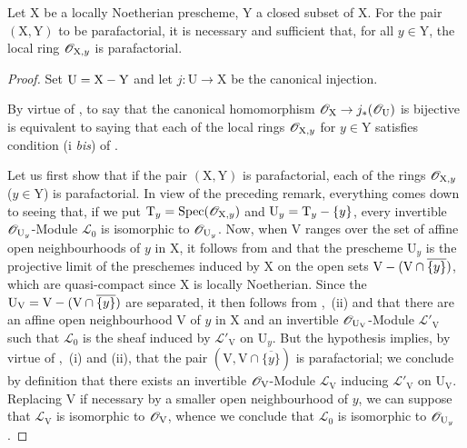 \begin{proposition}[21.13.10]
\label{IV.21.13.10}
Let $\mathrm{X}$ be a locally Noetherian prescheme, $\mathrm{Y}$ a closed subset of $\mathrm{X}$.
For the pair $(\mathrm{X},\mathrm{Y})$ to be parafactorial, it is necessary and sufficient that, for all $y\in\mathrm{Y}$, the local ring $\mathscr{O}_{\mathrm{X},y}$ is parafactorial.
\end{proposition}

\begin{proof}
Set $\mathrm{U}=\mathrm{X}-\mathrm{Y}$ and let $j:\mathrm{U}\to\mathrm{X}$ be the canonical injection.

By virtue of , to say that the canonical homomorphism $\mathscr{O}_{\mathrm{X}}\to j_*(\mathscr{O}_{\mathrm{U}})$ is bijective is equivalent to saying that each of the local rings $\mathscr{O}_{\mathrm{X},y}$ for $y\in\mathrm{Y}$ satisfies condition (i \emph{bis}) of .

Let us first show that if the pair $(\mathrm{X},\mathrm{Y})$ is parafactorial, each of the rings $\mathscr{O}_{\mathrm{X},y}$ ($y\in\mathrm{Y}$) is parafactorial.
In view of the preceding remark, everything comes down to seeing that, if we put $\mathrm{T}_y=\operatorname{Spec}(\mathscr{O}_{\mathrm{X},y})$ and $\mathrm{U}_y=\mathrm{T}_y-\{y\}$, every invertible $\mathscr{O}_{\mathrm{U}_y}$-Module $\mathscr{L}_0$ is isomorphic to $\mathscr{O}_{\mathrm{U}_y}$.
Now, when $\mathrm{V}$ ranges over the set of affine open neighbourhoods of $y$ in $\mathrm{X}$, it follows from  and  that the prescheme $\mathrm{U}_y$ is the projective limit of the preschemes induced by $\mathrm{X}$ on the open sets $\mathrm{V}-(\mathrm{V}\cap\overline{\{y\}})$, which are quasi-compact since $\mathrm{X}$ is locally Noetherian.
Since the $\mathrm{U}_{\mathrm{V}}=\mathrm{V}-(\mathrm{V}\cap\overline{\{y\}})$ are separated, it then follows from ,~(ii) and  that there are an affine open neighbourhood $\mathrm{V}$ of $y$ in $\mathrm{X}$ and an invertible $\mathscr{O}_{\mathrm{U}_{\mathrm{V}}}$-Module $\mathscr{L}'_{\mathrm{V}}$ such that $\mathscr{L}_0$ is the sheaf induced by $\mathscr{L}'_{\mathrm{V}}$ on $\mathrm{U}_y$.
But the hypothesis implies, by virtue of ,~(i) and (ii), that the pair $(\mathrm{V},\mathrm{V}\cap\overline{\{y\}})$ is parafactorial; we conclude by definition  that there exists an invertible $\mathscr{O}_{\mathrm{V}}$-Module $\mathscr{L}_{\mathrm{V}}$ inducing $\mathscr{L}'_{\mathrm{V}}$ on $\mathrm{U}_{\mathrm{V}}$. Replacing $\mathrm{V}$ if necessary by a smaller open neighbourhood of $y$, we can suppose that $\mathscr{L}_{\mathrm{V}}$ is isomorphic to $\mathscr{O}_{\mathrm{V}}$, whence we conclude that $\mathscr{L}_0$ is isomorphic to $\mathscr{O}_{\mathrm{U}_y}$.


\end{proof}

